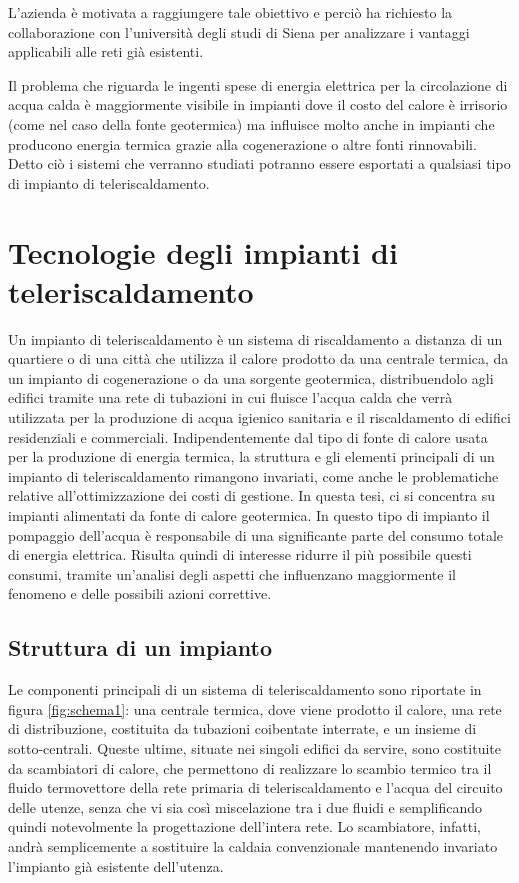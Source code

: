 \documentclass[laurea,oneside,11pt]{USiena_tesiLM}
\begin{document}
L'azienda è motivata a raggiungere tale obiettivo e perciò ha richiesto la collaborazione con l'università degli studi di Siena per analizzare i vantaggi applicabili alle reti già esistenti.

Il problema che riguarda le ingenti spese di energia elettrica per la circolazione di acqua calda è maggiormente visibile in impianti dove il costo del calore è irrisorio (come nel caso della fonte geotermica) ma influisce molto anche in impianti che producono energia termica grazie alla cogenerazione o altre fonti rinnovabili. Detto ciò i sistemi che verranno studiati potranno essere esportati a qualsiasi tipo di impianto di teleriscaldamento.


\chapter{Tecnologie degli impianti di teleriscaldamento}
Un impianto di teleriscaldamento è un  sistema di riscaldamento a distanza di un quartiere o di una città 
che utilizza il calore prodotto da una centrale termica, da un impianto di cogenerazione o da una sorgente geotermica, distribuendolo agli edifici tramite una rete di tubazioni in cui fluisce l'acqua calda che verrà utilizzata per la produzione di acqua igienico sanitaria e il riscaldamento di edifici residenziali e commerciali. Indipendentemente dal tipo di fonte di calore usata per la produzione di energia termica, la struttura e gli elementi principali di un impianto di teleriscaldamento rimangono invariati, come anche le problematiche relative all'ottimizzazione dei costi di gestione. In questa tesi, ci si concentra su impianti alimentati da fonte di calore geotermica. In questo tipo di impianto il pompaggio dell'acqua è responsabile di una significante parte del consumo totale di energia elettrica. Risulta quindi di interesse ridurre il più possibile questi consumi, tramite un'analisi degli aspetti che influenzano maggiormente il fenomeno e delle possibili azioni correttive. 

\section{Struttura di un impianto}
Le componenti principali di un sistema di teleriscaldamento sono  riportate in figura \ref{fig:schema1}: una centrale termica, dove viene prodotto il calore, una rete di distribuzione, costituita da tubazioni 
coibentate interrate, e un insieme di sotto-centrali. Queste ultime, situate nei singoli 
edifici da servire, sono costituite da scambiatori di calore, che permettono di realizzare 
lo scambio termico tra il fluido termovettore  della rete primaria di teleriscaldamento e l'acqua del circuito delle utenze, senza che vi sia così miscelazione tra i due fluidi e  semplificando quindi notevolmente la progettazione dell'intera rete. Lo scambiatore, infatti, andrà semplicemente a sostituire la  caldaia convenzionale mantenendo invariato l'impianto già esistente dell'utenza.
\end{document}
